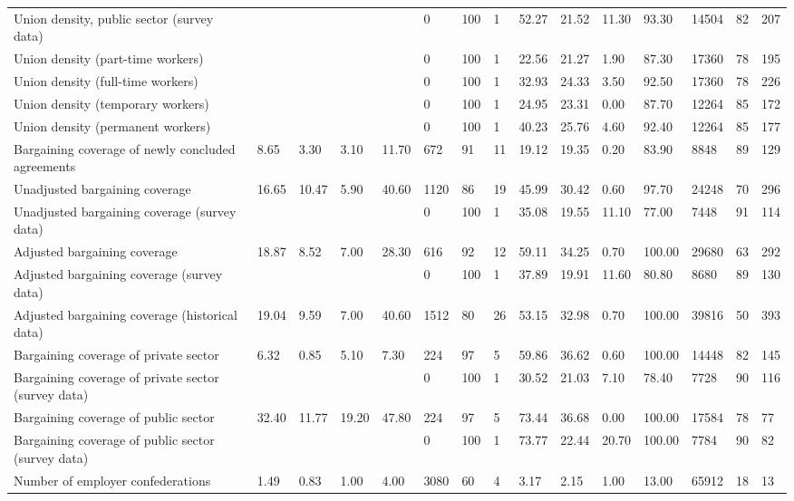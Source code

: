 \begin{longtable}{lllllllllllllll}
Union density, public sector (survey data) &  &  &  &  & 0 & 100 & 1 & 52.27 & 21.52 & 11.30 & 93.30 & 14504 & 82 & 207\\
Union density (part-time workers) &  &  &  &  & 0 & 100 & 1 & 22.56 & 21.27 & 1.90 & 87.30 & 17360 & 78 & 195\\
Union density (full-time workers) &  &  &  &  & 0 & 100 & 1 & 32.93 & 24.33 & 3.50 & 92.50 & 17360 & 78 & 226\\
Union density (temporary workers) &  &  &  &  & 0 & 100 & 1 & 24.95 & 23.31 & 0.00 & 87.70 & 12264 & 85 & 172\\
\addlinespace
Union density (permanent workers) &  &  &  &  & 0 & 100 & 1 & 40.23 & 25.76 & 4.60 & 92.40 & 12264 & 85 & 177\\
Bargaining coverage of newly concluded agreements & 8.65 & 3.30 & 3.10 & 11.70 & 672 & 91 & 11 & 19.12 & 19.35 & 0.20 & 83.90 & 8848 & 89 & 129\\
Unadjusted bargaining coverage & 16.65 & 10.47 & 5.90 & 40.60 & 1120 & 86 & 19 & 45.99 & 30.42 & 0.60 & 97.70 & 24248 & 70 & 296\\
Unadjusted bargaining coverage (survey data) &  &  &  &  & 0 & 100 & 1 & 35.08 & 19.55 & 11.10 & 77.00 & 7448 & 91 & 114\\
Adjusted bargaining coverage & 18.87 & 8.52 & 7.00 & 28.30 & 616 & 92 & 12 & 59.11 & 34.25 & 0.70 & 100.00 & 29680 & 63 & 292\\
\addlinespace
Adjusted bargaining coverage (survey data) &  &  &  &  & 0 & 100 & 1 & 37.89 & 19.91 & 11.60 & 80.80 & 8680 & 89 & 130\\
Adjusted bargaining coverage (historical data) & 19.04 & 9.59 & 7.00 & 40.60 & 1512 & 80 & 26 & 53.15 & 32.98 & 0.70 & 100.00 & 39816 & 50 & 393\\
Bargaining coverage of private sector & 6.32 & 0.85 & 5.10 & 7.30 & 224 & 97 & 5 & 59.86 & 36.62 & 0.60 & 100.00 & 14448 & 82 & 145\\
Bargaining coverage of private sector (survey data) &  &  &  &  & 0 & 100 & 1 & 30.52 & 21.03 & 7.10 & 78.40 & 7728 & 90 & 116\\
Bargaining coverage of public sector & 32.40 & 11.77 & 19.20 & 47.80 & 224 & 97 & 5 & 73.44 & 36.68 & 0.00 & 100.00 & 17584 & 78 & 77\\
\addlinespace
Bargaining coverage of public sector (survey data) &  &  &  &  & 0 & 100 & 1 & 73.77 & 22.44 & 20.70 & 100.00 & 7784 & 90 & 82\\
Number of employer confederations & 1.49 & 0.83 & 1.00 & 4.00 & 3080 & 60 & 4 & 3.17 & 2.15 & 1.00 & 13.00 & 65912 & 18 & 13\\

\end{longtable}
